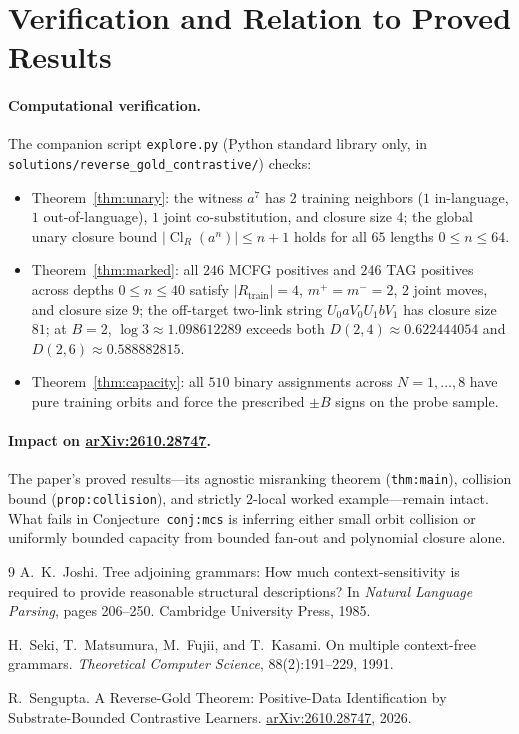 \documentclass[11pt]{article}
\theoremstyle{plain}
\theoremstyle{definition}
\theoremstyle{remark}
\DeclareMathOperator{\Cl}{Cl}
\begin{document}
\section{Verification and Relation to Proved Results}

\paragraph{Computational verification.}
The companion script \texttt{explore.py} (Python standard library only, in \texttt{solutions/reverse\_gold\_contrastive/}) checks:
\begin{itemize}[leftmargin=2em,itemsep=1pt,topsep=3pt]
\item Theorem~\ref{thm:unary}: the witness $a^7$ has $2$ training neighbors ($1$ in-language, $1$ out-of-language), $1$ joint co-substitution, and closure size $4$; the global unary closure bound $|\Cl_R(a^n)| \le n+1$ holds for all $65$ lengths $0 \le n \le 64$.
\item Theorem~\ref{thm:marked}: all $246$ MCFG positives and $246$ TAG positives across depths $0 \le n \le 40$ satisfy $|R_{\mathrm{train}}| = 4$, $m^+ = m^- = 2$, $2$ joint moves, and closure size $9$; the off-target two-link string $U_0 a V_0 U_1 b V_1$ has closure size $81$; at $B = 2$, $\log 3 \approx 1.098612289$ exceeds both $D(2, 4) \approx 0.622444054$ and $D(2, 6) \approx 0.588882815$.
\item Theorem~\ref{thm:capacity}: all $510$ binary assignments across $N = 1, \dots, 8$ have pure training orbits and force the prescribed $\pm B$ signs on the probe sample.
\end{itemize}

\paragraph{Impact on \href{https://arxiv.org/abs/2610.28747}{arXiv:2610.28747}.}
The paper's proved results---its agnostic misranking theorem (\texttt{thm:main}), collision bound (\texttt{prop:collision}), and strictly $2$-local worked example---remain intact. What fails in Conjecture~\texttt{conj:mcs} is inferring either small orbit collision or uniformly bounded capacity from bounded fan-out and polynomial closure alone.

\begin{thebibliography}{9}
A.~K.~Joshi.
Tree adjoining grammars: How much context-sensitivity is required to provide reasonable structural descriptions?
In \emph{Natural Language Parsing}, pages 206--250. Cambridge University Press, 1985.

H.~Seki, T.~Matsumura, M.~Fujii, and T.~Kasami.
On multiple context-free grammars.
\emph{Theoretical Computer Science}, 88(2):191--229, 1991.

R.~Sengupta.
A Reverse-Gold Theorem: Positive-Data Identification by Substrate-Bounded Contrastive Learners.
\href{https://arxiv.org/abs/2610.28747}{arXiv:2610.28747}, 2026.
\end{thebibliography}
\end{document}
